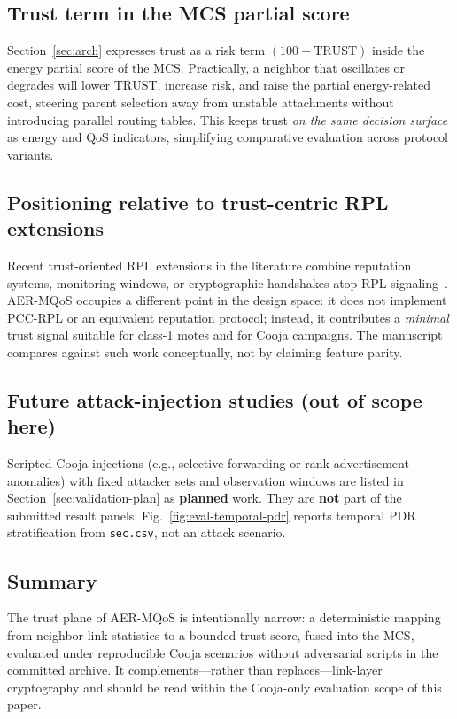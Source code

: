 \subsection{Trust term in the MCS partial score}
\begingroup\sloppy
Section~\ref{sec:arch} expresses trust as a risk term $(100-\mathrm{TRUST})$ inside the energy partial score of the MCS. Practically, a neighbor that oscillates or degrades will lower $\mathrm{TRUST}$, increase risk, and raise the partial energy-related cost, steering parent selection away from unstable attachments without introducing parallel routing tables. This keeps trust \emph{on the same decision surface} as energy and QoS indicators, simplifying comparative evaluation across protocol variants.
\endgroup

\subsection{Positioning relative to trust-centric RPL extensions}
Recent trust-oriented RPL extensions in the literature combine reputation systems, monitoring windows, or cryptographic handshakes atop RPL signaling~\cite{pishdar2021pccrpl}. AER-MQoS occupies a different point in the design space: it does not implement PCC-RPL or an equivalent reputation protocol; instead, it contributes a \emph{minimal} trust signal suitable for class-1 motes and for Cooja campaigns. The manuscript compares against such work conceptually, not by claiming feature parity.

\subsection{Future attack-injection studies (out of scope here)}
Scripted Cooja injections (e.g., selective forwarding or rank advertisement anomalies) with fixed attacker sets and observation windows are listed in Section~\ref{sec:validation-plan} as \textbf{planned} work. They are \textbf{not} part of the submitted result panels: Fig.~\ref{fig:eval-temporal-pdr} reports temporal PDR stratification from \texttt{sec.csv}, not an attack scenario.

\subsection{Summary}
The trust plane of AER-MQoS is intentionally narrow: a deterministic mapping from neighbor link statistics to a bounded trust score, fused into the MCS, evaluated under reproducible Cooja scenarios without adversarial scripts in the committed archive. It complements---rather than replaces---link-layer cryptography and should be read within the Cooja-only evaluation scope of this paper.
